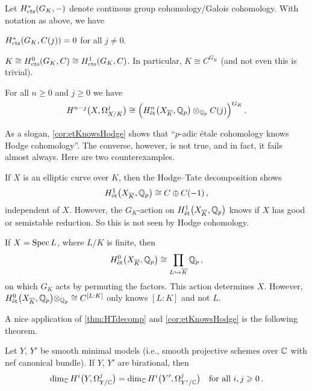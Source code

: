 \documentclass[a4paper, 10pt, oneside, DIV=9, chapterprefix=true, numbers=enddot]{scrbook}
\begin{document}
\begin{thm}[Tate]
	Let $H_{\mathrm{cts}}^*(G_K,-)$ denote continous group cohomology/Galois cohomology. With notation as above, we have
	\begin{numerate}
		\item $H_{\mathrm{cts}}^*(G_K,C(j))=0$ for all $j\neq 0$.
		\item $K\cong H_{\mathrm{cts}}^0(G_K,C)\cong H_{\mathrm{cts}}^1(G_K,C)$. In particular, $K\cong C^{G_K}$ (and not even this is trivial).
	\end{numerate}
\end{thm}
\begin{cor}\label{cor:etKnowsHodge}
	For all $n\geq 0$ and $j\geq 0$ we have
	\begin{equation*}
		H^{n-j}\big(X,\Omega_{X/K}^j\big)\cong \Big(H_\et^n\big(X_{\ov{K}},\IQ_p\big)\otimes_{\IQ_p}C(j)\Big)^{\smash{G_K}}\,.
	\end{equation*}
\end{cor}
\begin{cntx}
	As a slogan, \cref{cor:etKnowsHodge} shows that \enquote{$p$-adic étale cohomology knows Hodge cohomology}. The converse, however, is not true, and in fact, it fails almost always. Here are two counterexamples.
	\begin{numerate}
		\item If $X$ is an elliptic curve over $K$, then the Hodge--Tate decomposition shows
		\begin{equation*}
			H_\et^1\big(X_{\ov{K}},\IQ_p\big)\cong C\oplus C(-1)\,,
		\end{equation*}
		independent of $X$. However, the $G_K$-action on $H_\et^1\big(X_{\ov{K}},\IQ_p\big)$ knows if $X$ has good or semistable reduction. So this is not seen by Hodge cohomology.
		\item If $X=\operatorname{Spec} L$, where $L/K$ is finite, then
		\begin{equation*}
			H_\et^0\big(X_{\ov{K}},\IQ_p\big)\cong \prod_{L\monomorphism\ov{K}}\IQ_p\,,
		\end{equation*}
		on which $G_K$ acts by permuting the factors. This action determines $X$. However, $H_\et^0\big(X_{\ov{K}},\IQ_p\big)\otimes_{\IQ_p}\cong C^{[L:K]}$ only knows $[L:K]$ and not $L$.
	\end{numerate}
\end{cntx}
A nice application of \cref{thm:HTdecomp} and \cref{cor:etKnowsHodge} is the following theorem.
\begin{thm}\label{thm:MinimalModels}
	Let $Y$, $Y'$ be smooth minimal models (i.e., smooth projective schemes over $\mathbb{C}$ with nef canonical bundle). If $Y$, $Y'$ are birational, then
	\begin{equation*}
		\dim_{\mathbb{C}} H^i\big(Y,\Omega_{Y/\mathbb{C}}^j\big)=\dim_{\mathbb{C}} H^i\big(Y',\Omega_{Y'/\mathbb{C}}^j\big)\quad\text{for all }i,j\geqslant 0\,.
	\end{equation*}
\end{thm}
\end{document}
